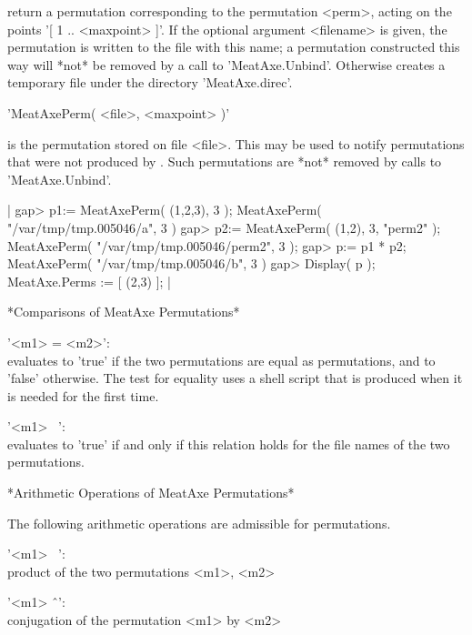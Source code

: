 return a {\MeatAxe} permutation corresponding to the permutation <perm>,
acting on the points '[ 1 .. <maxpoint> ]'.
If the optional argument <filename> is given, the {\MeatAxe} permutation
is written to the file with this name; a permutation constructed this way
will *not* be removed by a call to 'MeatAxe.Unbind'.  Otherwise {\GAP}
creates a temporary file under the directory 'MeatAxe.direc'.

\vspace{5mm}

'MeatAxePerm( <file>, <maxpoint> )'

is the {\MeatAxe} permutation stored on file <file>.
This may be used to notify {\MeatAxe} permutations that were not produced
by {\GAP}.  Such permutations are *not* removed by calls to 'MeatAxe.Unbind'.

|    gap> p1:= MeatAxePerm( (1,2,3), 3 );
    MeatAxePerm( "/var/tmp/tmp.005046/a", 3 )
    gap> p2:= MeatAxePerm( (1,2), 3, "perm2" );
    MeatAxePerm( "/var/tmp/tmp.005046/perm2", 3 );
    gap> p:= p1 * p2;
    MeatAxePerm( "/var/tmp/tmp.005046/b", 3 )
    gap> Display( p );
    MeatAxe.Perms := [
        (2,3)
    ]; |


*Comparisons of MeatAxe Permutations*

'<m1> = <m2>':\\ evaluates to 'true' if the two {\MeatAxe} permutations are
                 equal as permutations, and to 'false' otherwise.
                 The test for equality uses a shell script that is produced
                 when it is needed for the first time.

'<m1> \<\ <m2>': \\ evaluates to 'true' if and only if this relation holds
                    for the file names of the two {\MeatAxe} permutations.

\vspace{5mm}

*Arithmetic Operations of MeatAxe Permutations*

The following arithmetic operations are admissible for {\MeatAxe}
permutations.

'<m1> \*\ <m2>':\\ product of the two {\MeatAxe} permutations <m1>, <m2>

'<m1> \^\ <m2>':\\ conjugation of the {\MeatAxe} permutation <m1> by <m2>

